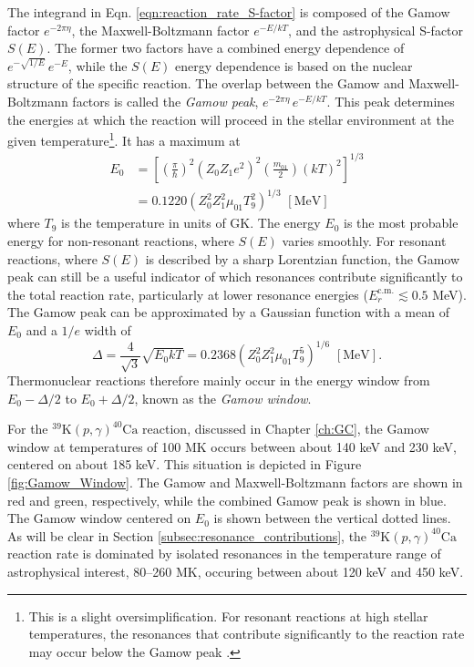 The integrand in Eqn. \ref{eqn:reaction_rate_S-factor} is composed of the Gamow factor $e^{-2 \pi \eta}$, the Maxwell-Boltzmann factor $e^{-E/kT}$, and the astrophysical S-factor $S(E)$. The former two factors have a combined energy dependence of $e^{-\sqrt{1/E}} \, e^{-E}$, while the $S(E)$ energy dependence is based on the nuclear structure of the specific reaction. The overlap between the Gamow and Maxwell-Boltzmann factors is called the \emph{Gamow peak}, $e^{-2 \pi \eta} \, e^{-E/kT}$. This peak determines the energies at which the reaction will proceed in the stellar environment at the given temperature\footnote{This is a slight oversimplification. For resonant reactions at high stellar temperatures, the resonances that contribute significantly to the reaction rate may occur below the Gamow peak \cite{Iliadis2015}.}. It has a maximum at
\begin{align}
E_{0} &= \left[ \left(\frac{\pi}{\hbar}\right)^{2} (Z_{0} Z_{1} e^{2})^{2} \left(\frac{m_{01}}{2}\right) (kT)^{2} \right]^{1/3} \nonumber \\
&= 0.1220 \left(Z_{0}^{2} Z_{1}^{2} \mu_{01} T_{9}^{2} \right)^{1/3} \,\, [\mathrm{MeV}]
\end{align}
where $T_{9}$ is the temperature in units of GK. The energy $E_{0}$ is the most probable energy for non-resonant reactions, where $S(E)$ varies smoothly. For resonant reactions, where $S(E)$ is described by a sharp Lorentzian function, the Gamow peak can still be a useful indicator of which resonances contribute significantly to the total reaction rate, particularly at lower resonance energies ($E_{r}^{\mathrm{c.m.}} \lesssim 0.5$ MeV). The Gamow peak can be approximated by a Gaussian function with a mean of $E_{0}$ and a $1/e$ width of
\begin{equation}
\Delta = \frac{4}{\sqrt{3}} \sqrt{E_{0} k T} = 0.2368 \left(Z_{0}^{2} Z_{1}^{2} \mu_{01} T_{9}^{5}\right)^{1/6} \,\, [\mathrm{MeV}].
\end{equation}
Thermonuclear reactions therefore mainly occur in the energy window from $E_{0} - \Delta/2$ to $E_{0} + \Delta/2$, known as the \emph{Gamow window}.

For the $^{39}\mathrm{K}(p,\gamma)^{40}\mathrm{Ca}$ reaction, discussed in Chapter \ref{ch:GC}, the Gamow window at temperatures of 100 MK occurs between about 140 keV and 230 keV, centered on about 185 keV. This situation is depicted in Figure \ref{fig:Gamow_Window}. The Gamow and Maxwell-Boltzmann factors are shown in red and green, respectively, while the combined Gamow peak is shown in blue. The Gamow window centered on $E_{0}$ is shown between the vertical dotted lines. As will be clear in Section \ref{subsec:resonance_contributions}, the $^{39}\mathrm{K}(p,\gamma)^{40}\mathrm{Ca}$ reaction rate is dominated by isolated resonances in the temperature range of astrophysical interest, 80--260 MK, occuring between about 120 keV and 450 keV.

